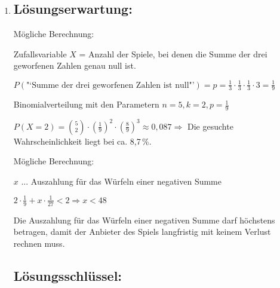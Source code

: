\begin{langesbeispiel}
{\begin{enumerate}
Bei $Y$ hat jeder Wert die gleiche Wahrscheinlichkeit $\left(=\frac{1}{9}\right)$, bei $X$ hat 4 die größte Wahrscheinlichkeit $\left(=3\cdot\frac{1}{3}\cdot\frac{1}{3}=\frac{1}{3}\right)$. Der Unterschied ist bei 4 am größten, er beträgt $\frac{2}{9}$.

oder:

Die Wahrscheinlichkeit für 4 ist bei Herrn Fischer dreimal so groß wie bei Frau Fischer.

	\subsection{Lösungsschlüssel:}
	\begin{itemize}
		\item Ein Ausgleichspunkt für die vollständige Angabe der korrekten Werte für $Y$. 
		\item Ein Punkt für die Angabe des gesuchten Wertes und einer korrekten Berechnung des Unterschieds.
	\end{itemize}
	
	\item \subsection{Lösungserwartung:}
			
	Mögliche Berechnung:
	
	Zufallsvariable $X$ = Anzahl der Spiele, bei denen die Summe der drei geworfenen Zahlen genau null ist.
	
	$P(\text{"`Summe der drei geworfenen Zahlen ist null"'})=p=\frac{1}{3}\cdot\frac{1}{3}\cdot\frac{1}{3}\cdot 3=\frac{1}{9}$
	
	Binomialverteilung mit den Parametern $n=5, k=2, p=\frac{1}{9}$
	
	$P(X=2)=\binom{5}{2}\cdot\left(\frac{1}{9}\right)^2\cdot\left(\frac{8}{9}\right)^3\approx 0,087 \Rightarrow$ Die gesuchte Wahrscheinlichkeit liegt bei ca. 8,7\,\%.
	
	Mögliche Berechnung:
	
	$x$ ... Auszahlung für das Würfeln einer negativen Summe
	
	$2\cdot\frac{1}{9}+x\cdot\frac{1}{27}<2 \Rightarrow x<48$
	
	Die Auszahlung für das Würfeln einer negativen Summe darf höchstens  betragen, damit der Anbieter des Spiels langfristig mit keinem Verlust rechnen muss.

	\subsection{Lösungsschlüssel:}
	

\end{enumerate}}
\end{langesbeispiel}
